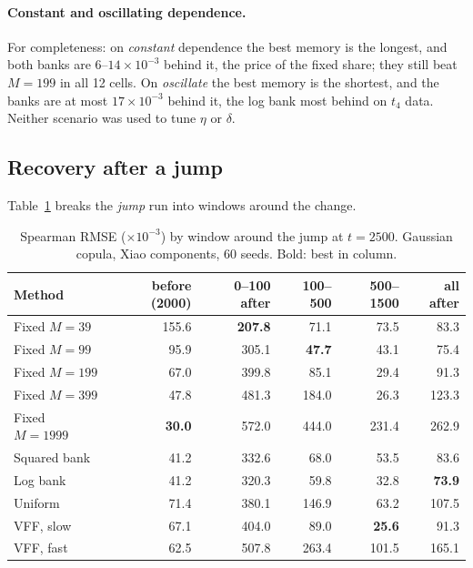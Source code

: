 \paragraph{Constant and oscillating dependence.} For completeness: on \emph{constant} dependence
the best memory is the longest, and both banks are $6$--$14\times10^{-3}$ behind it, the price of
the fixed share; they still beat $M=199$ in all 12 cells. On \emph{oscillate} the best memory is
the shortest, and the banks are at most $17\times10^{-3}$ behind it, the log bank most behind on
$t_4$ data. Neither scenario was used to tune $\eta$ or $\delta$.

\subsection{Recovery after a jump}
\label{sec:recovery}

Table~\ref{tab:recovery} breaks the \emph{jump} run into windows around the change.

\begin{table}[ht]
  \centering
  \caption{Spearman RMSE ($\times10^{-3}$) by window around the jump at $t=2500$. Gaussian copula,
    Xiao components, 60 seeds. Bold: best in column.}
  \label{tab:recovery}
  \small
  \begin{tabular}{lrrrrr}
    \toprule
    Method & before (2000) & 0--100 after & 100--500 & 500--1500 & all after \\
    \midrule
    Fixed $M=39$   & 155.6 & \textbf{207.8} & 71.1 & 73.5 & 83.3 \\
    Fixed $M=99$   & 95.9  & 305.1 & \textbf{47.7} & 43.1 & 75.4 \\
    Fixed $M=199$  & 67.0  & 399.8 & 85.1 & 29.4 & 91.3 \\
    Fixed $M=399$  & 47.8  & 481.3 & 184.0 & 26.3 & 123.3 \\
    Fixed $M=1999$ & \textbf{30.0} & 572.0 & 444.0 & 231.4 & 262.9 \\
    \addlinespace
    Squared bank   & 41.2  & 332.6 & 68.0 & 53.5 & 83.6 \\
    Log bank       & 41.2  & 320.3 & 59.8 & 32.8 & \textbf{73.9} \\
    Uniform        & 71.4  & 380.1 & 146.9 & 63.2 & 107.5 \\
    VFF, slow      & 67.1  & 404.0 & 89.0 & \textbf{25.6} & 91.3 \\
    VFF, fast      & 62.5  & 507.8 & 263.4 & 101.5 & 165.1 \\
    \bottomrule
  \end{tabular}
\end{table}


